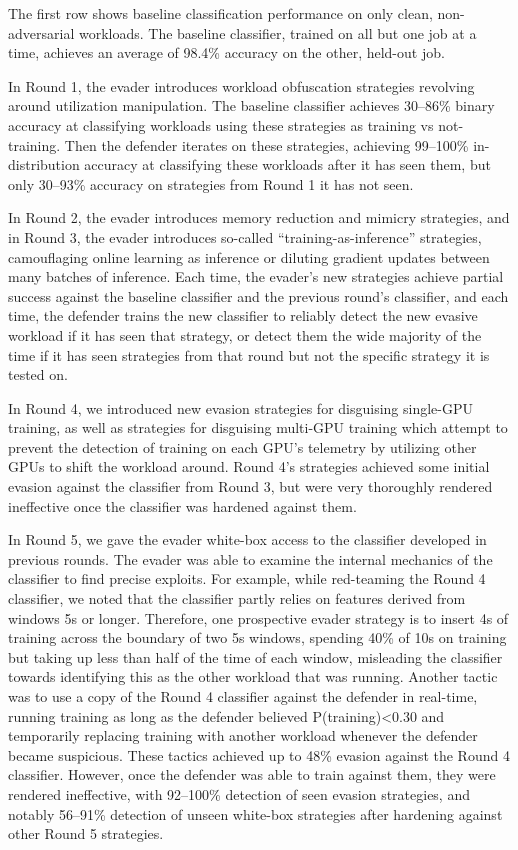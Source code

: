 The first row shows baseline classification performance on only clean, non-adversarial workloads. The baseline classifier, trained on all but one job at a time, achieves an average of 98.4\% accuracy on the other, held-out job.

In Round 1, the evader introduces workload obfuscation strategies revolving around utilization manipulation. The baseline classifier achieves 30--86\% binary accuracy at classifying workloads using these strategies as training vs not-training. Then the defender iterates on these strategies, achieving 99--100\% in-distribution accuracy at classifying these workloads after it has seen them, but only 30--93\% accuracy on strategies from Round 1 it has not seen.

In Round 2, the evader introduces memory reduction and mimicry strategies, and in Round 3, the evader introduces so-called ``training-as-inference'' strategies, camouflaging online learning as inference or diluting gradient updates between many batches of inference. Each time, the evader's new strategies achieve partial success against the baseline classifier and the previous round's classifier, and each time, the defender trains the new classifier to reliably detect the new evasive workload if it has seen that strategy, or detect them the wide majority of the time if it has seen strategies from that round but not the specific strategy it is tested on.

In Round 4, we introduced new evasion strategies for disguising single-GPU training, as well as strategies for disguising multi-GPU training which attempt to prevent the detection of training on each GPU's telemetry by utilizing other GPUs to shift the workload around. Round 4's strategies achieved some initial evasion against the classifier from Round 3, but were very thoroughly rendered ineffective once the classifier was hardened against them.

In Round 5, we gave the evader white-box access to the classifier developed in previous rounds. The evader was able to examine the internal mechanics of the classifier to find precise exploits. For example, while red-teaming the Round 4 classifier, we noted that the classifier partly relies on features derived from windows 5s or longer. Therefore, one prospective evader strategy is to insert 4s of training across the boundary of two 5s windows, spending 40\% of 10s on training but taking up less than half of the time of each window, misleading the classifier towards identifying this as the other workload that was running. Another tactic was to use a copy of the Round 4 classifier against the defender in real-time, running training as long as the defender believed P(training)<0.30 and temporarily replacing training with another workload whenever the defender became suspicious. These tactics achieved up to 48\% evasion against the Round 4 classifier. However, once the defender was able to train against them, they were rendered ineffective, with 92--100\% detection of seen evasion strategies, and notably 56--91\% detection of unseen white-box strategies after hardening against other Round 5 strategies.

